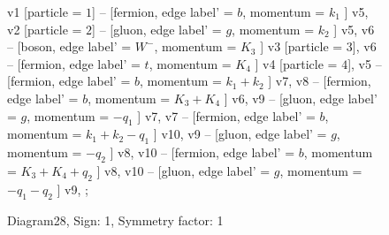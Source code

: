 \documentclass{revtex4}
\begin{document}
\begin{figure}[!htb]
\begin{center}
{    %
v1 [particle = \(1\)] -- [fermion, edge label' = \(b\), momentum = \(k_{1}\) ] v5, 
v2 [particle = \(2\)] -- [gluon, edge label' = \(g\), momentum = \(k_{2}\) ] v5, 
v6 -- [boson, edge label' = \(W^{-}\), momentum = \(K_{3}\) ] v3 [particle = \(3\)], 
v6 -- [fermion, edge label' = \(t\), momentum = \(K_{4}\) ] v4 [particle = \(4\)], 
v5 -- [fermion, edge label' = \(b\), momentum = \(k_{1} + k_{2}\) ] v7, 
v8 -- [fermion, edge label' = \(b\), momentum = \(K_{3} + K_{4}\) ] v6, 
v9 -- [gluon, edge label' = \(g\), momentum = \(-q_{1}\) ] v7, 
v7 -- [fermion, edge label' = \(b\), momentum = \(k_{1} + k_{2} - q_{1}\) ] v10, 
v9 -- [gluon, edge label' = \(g\), momentum = \(-q_{2}\) ] v8, 
v10 -- [fermion, edge label' = \(b\), momentum = \(K_{3} + K_{4} + q_{2}\) ] v8, 
v10 -- [gluon, edge label' = \(g\), momentum = \(-q_{1} - q_{2}\) ] v9, 
};
\end{center}
\caption{Diagram28, Sign: 1, Symmetry factor: 1}
\end{figure}
\newpage
\end{document}
